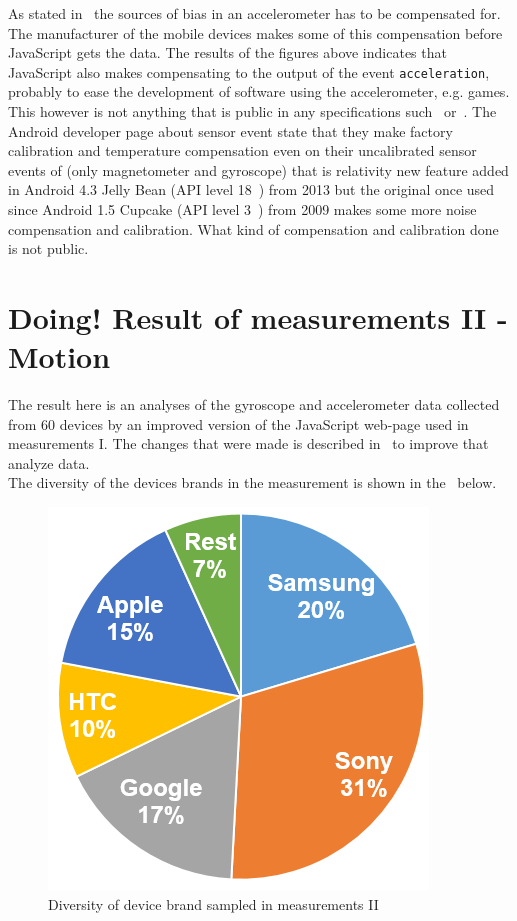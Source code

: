 As stated in~\cite{acc:kionixerr} the sources of bias in an accelerometer has to be compensated for. The manufacturer of the mobile devices makes some of this compensation before JavaScript gets the data. The results of the figures above indicates that JavaScript also makes compensating to the output of the event \texttt{acceleration}, probably to ease the development of software using the accelerometer, e.g. games. This however is not anything that is public in any specifications such~\cite{sensor:W3Cspec} or~\cite{sensor:accIncludingGravity}. The Android developer page about sensor event \cite{android:sensorEvent} state that they make factory calibration and temperature compensation even on their uncalibrated sensor events of (only magnetometer and gyroscope) that is relativity new feature added in Android 4.3 Jelly Bean (API level 18~\cite{android:API18}) from 2013 but the original once used since Android 1.5 Cupcake (API level 3~\cite{android:API3}) from 2009 makes some more noise compensation and calibration. What kind of compensation and calibration done is not public. 

\section{\textbf{Doing! }Result of measurements II  - Motion}\label{res:testII}
The result here is an analyses of the gyroscope and accelerometer data collected from 60 devices by an improved version of the JavaScript web-page used in measurements I. The changes that were made is described in~ to improve that analyze data. \\
The diversity of the devices brands in the measurement is shown in the~ below.
\begin{figure}[H]
	\centering
	\includegraphics[scale=.4]{img/measure2-brands}
	\caption{Diversity of device brand sampled in measurements II}
	\label{fig:brandII}
\end{figure}

